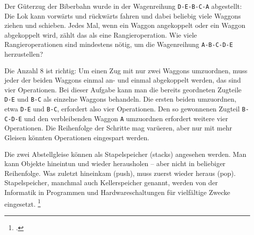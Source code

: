 \documentclass{bschlangaul-aufgabe}
\begin{document}

Der Güterzug der Biberbahn wurde in der Wagenreihung \verb|D-E-B-C-A|
abgestellt: Die Lok kann vorwärts und rückwärts fahren und dabei
beliebig viele Waggons ziehen und schieben. Jedes Mal, wenn ein Waggon
angekoppelt oder ein Waggon abgekoppelt wird, zählt das als eine
Rangieroperation. Wie viele Rangieroperationen sind mindestens nötig, um
die Wagenreihung \verb|A-B-C-D-E| herzustellen?

Die Anzahl 8 ist richtig: Um einen Zug mit nur zwei Waggons umzuordnen,
muss jeder der beiden Waggons einmal an- und einmal abgekoppelt werden,
das sind vier Operationen. Bei dieser Aufgabe kann man die bereits
geordneten Zugteile \verb|D-E| und \verb|B-C| als einzelne Waggons
behandeln. Die ersten beiden umzuordnen, etwa \verb|D-E| und \verb|B-C|,
erfordert also vier Operationen. Den so gewonnenen Zugteil
\verb|B-C-D-E| und den verbleibenden Waggon \verb|A| umzuordnen
erfordert weitere vier Operationen. Die Reihenfolge der Schritte mag
varüeren, aber nur mit mehr Gleisen könnten Operationen eingespart
werden.

Die zwei Abstellgleise können als Stapelspeicher (stacks) angesehen
werden. Man kann Objekte hineintun und wieder herausholen – aber nicht
in beliebiger Reihenfolge. Was zuletzt hineinkam (push), muss zuerst
wieder heraus (pop). Stapelspeicher, manchmal auch Kellerspeicher
genannt, werden von der Informatik in Programmen und Hardwareschaltungen
für vielfältige Zwecke eingesetzt.
\footcite[Seite 23]{net:pdf:informatik-biber-2012}
\end{document}
